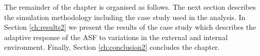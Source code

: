 %









The remainder of the chapter is organised as follows. The next section describes the simulation methodology including the case study used in the analysis. In Section \ref{ch:results2} we present the results of the case study which describes the adaptive response of the ASF to variations in the external and internal environment. Finally, Section \ref{ch:conclusion2} concludes the chapter.


